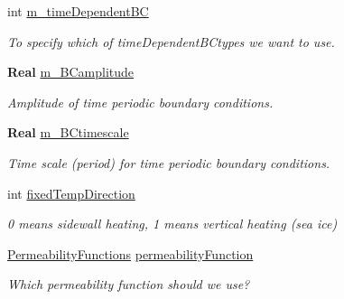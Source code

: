 \begin{DoxyCompactItemize}
\mbox{\label{class_mushy_layer_params_a937df03bcbfa36f79227b731e8531e13}} 
int \hyperlink{class_mushy_layer_params_a937df03bcbfa36f79227b731e8531e13}{m\+\_\+time\+Dependent\+BC}
\begin{DoxyCompactList}\small\item\em To specify which of time\+Dependent\+B\+Ctypes we want to use. \end{DoxyCompactList}\item 
\mbox{\label{class_mushy_layer_params_aece8565e95c703995b0dc90bcc7066db}} 
\textbf{ Real} \hyperlink{class_mushy_layer_params_aece8565e95c703995b0dc90bcc7066db}{m\+\_\+\+B\+Camplitude}
\begin{DoxyCompactList}\small\item\em Amplitude of time periodic boundary conditions. \end{DoxyCompactList}\item 
\mbox{\label{class_mushy_layer_params_acd308081fbec823c35e80f63b10d0b22}} 
\textbf{ Real} \hyperlink{class_mushy_layer_params_acd308081fbec823c35e80f63b10d0b22}{m\+\_\+\+B\+Ctimescale}
\begin{DoxyCompactList}\small\item\em Time scale (period) for time periodic boundary conditions. \end{DoxyCompactList}\item 
\mbox{\label{class_mushy_layer_params_ad6f93ffb81ff66d7cf3a8f26c41e807f}} 
int \hyperlink{class_mushy_layer_params_ad6f93ffb81ff66d7cf3a8f26c41e807f}{fixed\+Temp\+Direction}
\begin{DoxyCompactList}\small\item\em 0 means sidewall heating, 1 means vertical heating (sea ice) \end{DoxyCompactList}\item 
\mbox{\label{class_mushy_layer_params_ab73ff4bd56df707ef11f6dddd8055202}} 
\hyperlink{_mushy_layer_params_8h_a41f47972c3b8df9c133931b4b9b73584}{Permeability\+Functions} \hyperlink{class_mushy_layer_params_ab73ff4bd56df707ef11f6dddd8055202}{permeability\+Function}
\begin{DoxyCompactList}\small\item\em Which permeability function should we use? \end{DoxyCompactList}\item 

\end{DoxyCompactItemize}
